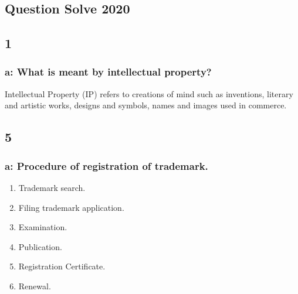 \documentclass[14 pt, letterpaper]{extarticle}
\begin{document}
\begin{justify}
	\section*{Question Solve 2020}
	
	\subsection*{1}
	\subsubsection*{a: What is meant by intellectual property?}
		Intellectual Property (IP) refers to creations of mind such as inventions, literary and artistic works, designs and symbols, names and images used in commerce.
		
	\subsection*{5}
	\subsubsection*{a: Procedure of registration of trademark.}
		\begin{enumerate}
			\item Trademark search.
			\item Filing trademark application.
			\item Examination.
			\item Publication.
			\item Registration Certificate.
			\item Renewal.
		\end{enumerate}

\end{justify}
\end{document}
